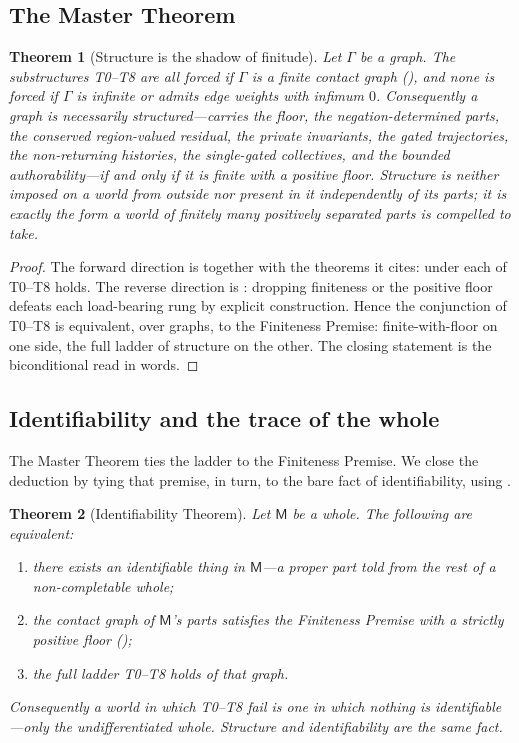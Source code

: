 \documentclass[11pt,a4paper]{article}
\theoremstyle{thmstyle}
\newtheorem{theorem}{Theorem}[section]
\theoremstyle{definition}
\theoremstyle{remark}
\newcommand{\Gph}{\Gamma}                 %
\newcommand{\med}{\mathsf{M}}             %
\begin{document}
\subsection{The Master Theorem}

\begin{theorem}[Structure is the shadow of finitude]
\label{thm:master}
Let $\Gph$ be a graph. The substructures T0--T8 are all forced if $\Gph$ is a
finite contact graph \textup{(}\textup{)}, and none is forced if
$\Gph$ is infinite or admits edge weights with infimum $0$. Consequently a graph
is necessarily structured---carries the floor, the negation-determined parts, the
conserved region-valued residual, the private invariants, the gated trajectories,
the non-returning histories, the single-gated collectives, and the bounded
authorability---\emph{if and only if} it is finite with a positive floor. Structure
is neither imposed on a world from outside nor present in it independently of its
parts; it is exactly the form a world of finitely many positively separated parts
is compelled to take.
\end{theorem}

\begin{proof}
The forward direction is  together with the theorems it
cites: under  each of T0--T8 holds. The reverse direction is
: dropping finiteness or the positive floor defeats each
load-bearing rung by explicit construction. Hence the conjunction of T0--T8 is
equivalent, over graphs, to the Finiteness Premise: finite-with-floor on one
side, the full ladder of structure on the other. The closing statement is the
biconditional read in words.
\end{proof}

\subsection{Identifiability and the trace of the whole}

The Master Theorem ties the ladder to the Finiteness Premise. We close the
deduction by tying that premise, in turn, to the bare fact of identifiability,
using .

\begin{theorem}[Identifiability Theorem]
\label{thm:identifiability}
Let $\med$ be a whole. The following are equivalent:
\begin{enumerate}[label=\textup{(\roman*)},leftmargin=2.2em]
\item there exists an identifiable thing in $\med$---a proper part told from the
rest of a non-completable whole;
\item the contact graph of $\med$'s parts satisfies the Finiteness Premise with a
strictly positive floor \textup{(}\textup{)};
\item the full ladder T0--T8 holds of that graph.
\end{enumerate}
Consequently a world in which T0--T8 fail is one in which nothing is
identifiable---only the undifferentiated whole. Structure and identifiability are
the same fact.
\end{theorem}
\end{document}
